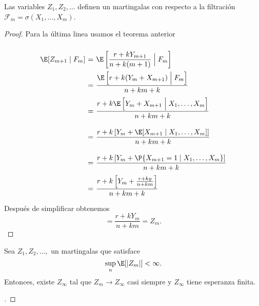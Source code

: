 \begin{theorem}
    Las variables $Z_1,Z_2,\ldots$ definen un martingalas con respecto a la filtración $\mathscr{F}_m = \sigma(X_1,\ldots, X_m)$.
\end{theorem}
\begin{proof} Para la última linea usamos el teorema anterior
    \[ \everymath{\displaystyle}
    \arraycolsep=1.8pt\def\arraystretch{3}
    \begin{array}{rcl}
        \E [Z_{m+1} \;|\; F_m] & = & \E \left[ \frac{r+k Y_{m+1}}{n+k(m+1)} \;\Big|\; F_m \right]\\
        & = & \frac{ \E\left[r+k (Y_{m}+ X_{m+1})\;\Big|\; F_m \right]}{n+km+k}\\
        & = & \frac{ r+k\E\left[Y_{m}+ X_{m+1}\;\Big|\; X_1,\ldots,X_m \right]}{n+km+k}\\
        & = & \frac{ r+k\left[Y_{m}+\E [X_{m+1}\;|\; X_1,\ldots,X_m] \right]}{n+km+k}\\
        & = & \frac{ r+k\left[Y_{m}+\P \{X_{m+1} = 1\;|\; X_1,\ldots,X_m\} \right]}{n+km+k}\\
        & = & \frac{ r+k\left[Y_{m}+ \frac{r+ky}{n+km} \right]}{n+km+k}\\
    \end{array} \]
    Después de simplificar obtenemos
    \[  = \frac{r+kY_m}{n+km} = Z_m. \]
\end{proof}

\begin{theorem}
    Sea $Z_1, Z_2,\ldots,$ un martingalas que satisface
    \[ \sup_n \E[|Z_m|] < \infty. \]
    Entonces, existe $Z_\infty$ tal que $Z_m \to Z_\infty$ casi siempre y $Z_\infty$ tiene esperanza finita.
\end{theorem}
\begin{proof}[]
\vspace*{-1em}
\end{proof}

